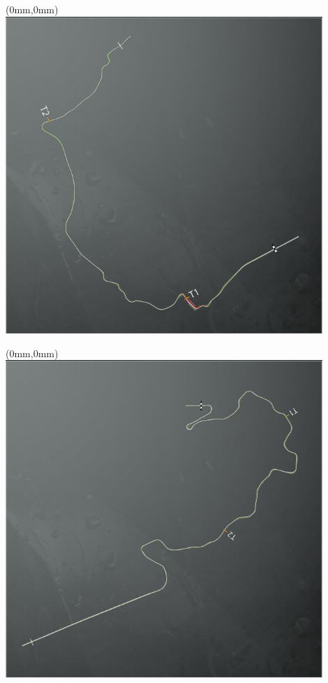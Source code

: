 \null\newpage
\begin{textblock*}{30mm}(0mm,0mm)%
\includegraphics[width=120mm]{TR/2015-05-20_00038.png}
\end{textblock*}
\null\newpage
\begin{textblock*}{30mm}(0mm,0mm)%
\includegraphics[width=120mm]{TR/2015-05-20_00040.png}
\end{textblock*}
